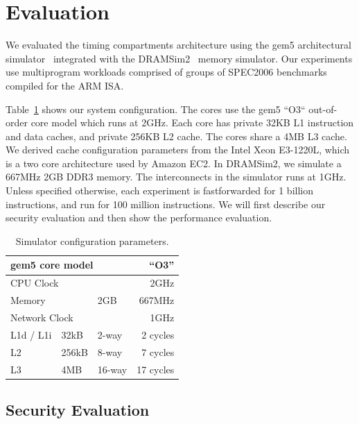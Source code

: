 \section{Evaluation}

We evaluated the timing compartments architecture using the gem5 architectural 
simulator~\cite{gem5} integrated with the DRAMSim2~\cite{DRAMSim2} 
memory simulator. Our experiments use multiprogram workloads 
comprised of groups of SPEC2006 benchmarks compiled for the ARM ISA. 

Table~\ref{tab:config} shows our system configuration.
The cores use the gem5 ``O3`` out-of-order core model which runs at 2GHz. 
Each core has private 32KB L1 instruction and data caches, and private 256KB L2 
cache. The cores share a 4MB L3 cache. We derived cache configuration 
parameters from the Intel Xeon E3-1220L, which is a two core architecture used 
by Amazon EC2. In DRAMSim2, we simulate a 667MHz 2GB DDR3 memory. The 
interconnects in the simulator runs at 1GHz. Unless specified otherwise, each experiment is 
fastforwarded for 1 billion instructions, and run for 100 million 
instructions. We will first describe our security evaluation and then show
the performance evaluation.

\begin{table}
    \caption{Simulator configuration parameters.}
    \centering
    \begin{tabular}{|l|l|l|r|}
        \hline
        \multicolumn{3}{|l|}{gem5 core model} & ``O3''        \\\hline
        \multicolumn{3}{|l|}{CPU Clock}    & 2GHz             \\\hline
        \hline
        \multicolumn{2}{|l|}{Memory}             & 2GB    & 667MHz  \\\hline
        \hline
        \multicolumn{3}{|l|}{Network Clock}      & 1GHz \\\hline
        \hline
        L1d / L1i  & 32kB   & 2-way  & 2 cycles\\\hline
        L2         & 256kB  & 8-way  & 7 cycles \\\hline
        L3         & 4MB    & 16-way & 17 cycles  \\\hline
    \end{tabular}
    \label{tab:config}
\end{table}

\subsection{Security Evaluation}

